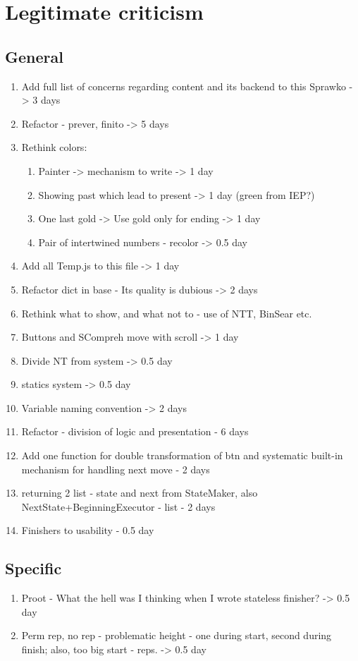 \documentclass[12pt]{article}
\begin{document}
\section{Legitimate criticism}
\subsection{General}
\begin {enumerate}
	\item Add full list of concerns regarding content and its backend to this Sprawko -> 3 days
	\item Refactor - prever, finito -> 5 days
	\item Rethink colors:
	\begin{enumerate}
		\item Painter -> mechanism to write -> 1 day
		\item Showing past which lead to present -> 1 day (green from IEP?)
		\item One last gold -> Use gold only for ending -> 1 day
		\item Pair of intertwined numbers - recolor -> 0.5 day
	\end{enumerate}
	\item Add all Temp.js to this file -> 1 day
	\item Refactor dict in base - Its quality is dubious -> 2 days
	\item Rethink what to show, and what not to - use of NTT, BinSear etc.
	\item Buttons and SCompreh move with scroll -> 1 day
	\item Divide NT from system -> 0.5 day
	\item statics system -> 0.5 day
	\item Variable naming convention -> 2 days
	\item Refactor - division of logic and presentation - 6 days
	\item Add one function for double transformation of btn and systematic built-in mechanism for handling next move - 2 days
	\item returning 2 list - state and next from StateMaker, also NextState+BeginningExecutor - list - 2 days 
	\item Finishers to usability - 0.5 day
\end{enumerate}
\subsection{Specific}
\begin {enumerate}
	\item Proot - What the hell was I thinking when I wrote stateless finisher? -> 0.5 day
	\item Perm rep, no rep - problematic height - one during start, second during finish; also, too big start - reps. -> 0.5 day
\end{enumerate}
\end{document}
